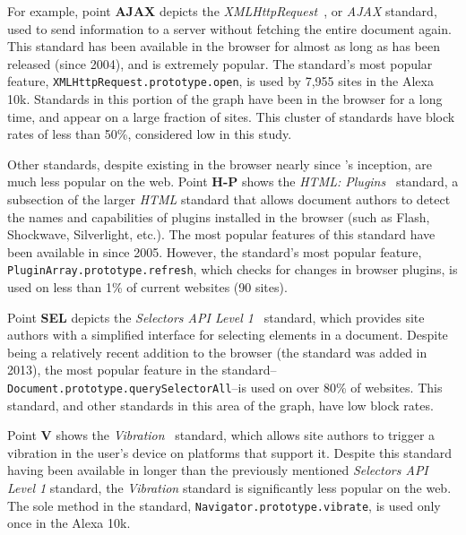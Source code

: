  For example, point \textbf{AJAX}
depicts the \textit{XMLHttpRequest}~\cite{ajaxwhatwg}, or \textit{AJAX} standard,
used to send information to a server without fetching the entire document
again.  This standard has been available in the browser for almost as long as
\FF has been released (since 2004), and is extremely popular. The standard's
most popular feature, \texttt{XMLHttpRequest.prototype.open}, is used by 7,955
sites in the Alexa 10k.  Standards in this portion of the graph have been in
the browser for a long time, and appear on a large fraction of sites.  This
cluster of standards have block rates of less than 50\%, considered low in this
study.

Other standards, despite existing in the browser nearly since \FF's inception,
are much less popular on the web.  Point \textbf{H-P} shows the \textit{HTML:
Plugins}~\cite{htmlpluginsw3c} standard, a subsection of the larger \textit{HTML}
standard that allows document authors to detect the names and capabilities of
plugins installed in the browser (such as Flash, Shockwave, Silverlight, etc.).
The most popular features of this standard have been available in \FF since
2005.  However, the standard's most popular feature,
\texttt{PluginArray.prototype.refresh}, which checks for changes in browser
plugins, is used on less than 1\% of current websites (90 sites).

Point \textbf{SEL} depicts the \emph{Selectors API Level
1}~\cite{selectors1w3c} standard, which provides site authors with a simplified
interface for selecting elements in a document.  Despite being a relatively
recent addition to the browser (the standard was added in 2013), the most
popular feature in the
standard--\texttt{Document.prototype.querySelectorAll}--is used on over 80\% of
websites.  This standard, and other standards in this area of the graph, have
low block rates.

Point \textbf{V} shows the \textit{Vibration}~\cite{vibrationapi} standard,
which allows site authors to trigger a vibration in the user's device on
platforms that support it.  Despite this standard having been available in \FF
longer than the previously mentioned \textit{Selectors API Level 1} standard,
the \textit{Vibration} standard is significantly less popular on the web.  The
sole method in the standard, \texttt{Navigator.prototype.vibrate}, is used only
once in the Alexa 10k.


